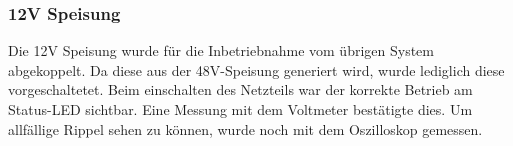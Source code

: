 \subsubsection{12V Speisung}
\label{subsubsec:Inbetriebnahme_12V_Speisungen}

Die 12V Speisung wurde für die Inbetriebnahme vom übrigen System abgekoppelt. Da diese aus der 48V-Speisung generiert wird, wurde lediglich diese vorgeschaltetet. Beim einschalten des Netzteils war der korrekte Betrieb am Status-LED sichtbar. Eine Messung mit dem Voltmeter bestätigte dies. Um allfällige Rippel sehen zu können, wurde noch mit dem Oszilloskop gemessen.

